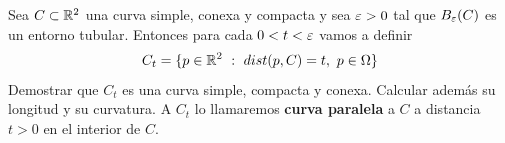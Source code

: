 
\begin{ejercicio}
    Sea $C\subset \mathbb{R}^2$ una curva simple, conexa y compacta y sea $\varepsilon>0$ tal que $B_\varepsilon(C)$ es un entorno tubular. Entonces para cada $0<t<\varepsilon$ vamos a definir
    \begin{gather*}
        C_t = \{p\in \mathbb{R}^2 \ : \ dist(p,C)=t,\ p\in \Omega\}
    \end{gather*}
    Demostrar que $C_t$ es una curva simple, compacta y conexa. Calcular además su longitud y su curvatura. A $C_t$ lo llamaremos \textbf{curva paralela} a $C$ a distancia $t>0$ en el interior de $C$.\\


\end{ejercicio}
